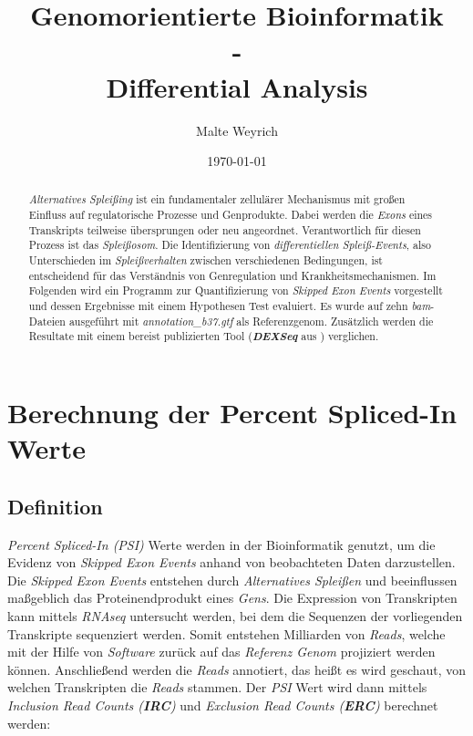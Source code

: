 \documentclass[12pt]{article}
\title{Genomorientierte Bioinformatik \\ - \\ Differential Analysis}
\author{Malte Weyrich}
\date{\today}
\begin{document}
\maketitle
\begin{abstract}
\textit{Alternatives Splei\ss ing} ist ein fundamentaler zellulärer Mechanismus  mit 
gro\ss en Einfluss auf regulatorische Prozesse und Genprodukte.
Dabei werden die \textit{Exons} eines Transkripts teilweise übersprungen oder neu angeordnet. 
Verantwortlich für diesen Prozess ist das \textit{Splei\ss osom}. 
Die Identifizierung von \textit{differentiellen Spleiß-Events}, also Unterschieden im \textit{Spleißverhalten} zwischen verschiedenen Bedingungen,
ist entscheidend für das Verständnis von Genregulation und Krankheitsmechanismen.
Im Folgenden wird ein Programm zur Quantifizierung von \textit{Skipped Exon Events} vorgestellt und
dessen Ergebnisse mit einem Hypothesen Test evaluiert. 
Es wurde auf zehn \textit{bam}-Dateien ausgeführt mit \textit{annotation\_b37.gtf}
als Referenzgenom.
Zusätzlich werden die Resultate mit einem bereist publizierten Tool (\textit{\textbf{DEXSeq}} aus \cite{anders2012detecting}) verglichen.

\end{abstract}

\newpage

\tableofcontents

\newpage


\section{Berechnung der Percent Spliced-In Werte}
\subsection{Definition}\label{sec:Definition}
\textit{Percent Spliced-In (PSI)} Werte werden in der Bioinformatik genutzt, um die 
Evidenz von \textit{Skipped Exon Events} anhand von beobachteten Daten darzustellen. 
Die \textit{Skipped Exon Events} entstehen durch \textit{Alternatives Splei\ss en} und beeinflussen ma\ss geblich das Proteinendprodukt
eines \textit{Gens}.
Die Expression von Transkripten kann mittels \textit{RNAseq} untersucht werden, bei dem die Sequenzen der
vorliegenden Transkripte sequenziert werden.
Somit entstehen Milliarden von \textit{Reads}, welche 
mit der Hilfe von \textit{Software} zurück auf das \textit{Referenz Genom} projiziert werden können.
Anschlie\ss end werden die \textit{Reads} annotiert, das hei\ss t es wird geschaut, von 
welchen Transkripten die \textit{Reads} stammen. 
Der \textit{PSI} Wert wird dann mittels \textit{Inclusion Read Counts (\textbf{IRC})} und \textit{Exclusion Read Counts (\textbf{ERC})} berechnet werden:
\end{document}
